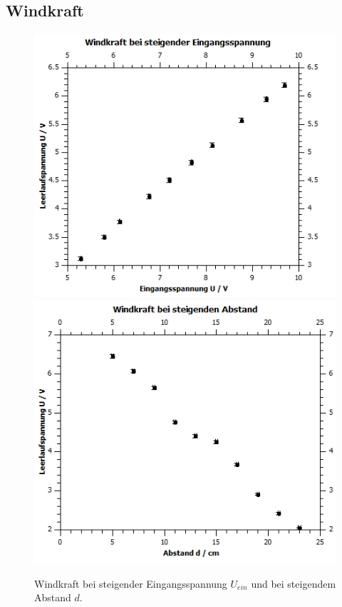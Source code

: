 \documentclass[12pt,a4paper,twoside]{article}
\begin{document}
\subsection{Windkraft}
\begin{figure}[H]
    \centering
    \includegraphics[width=0.6\linewidth]{nudes/wind spannung.jpg}
    \includegraphics[width=0.6\linewidth]{nudes/wind abstand.jpg}
    \caption{Windkraft bei steigender Eingangsspannung $U_{ein}$ und bei steigendem Abstand $d$. }
    \label{fig:zusammenfassung Windkraft steigend und fallend}
\end{figure}
\end{document}
